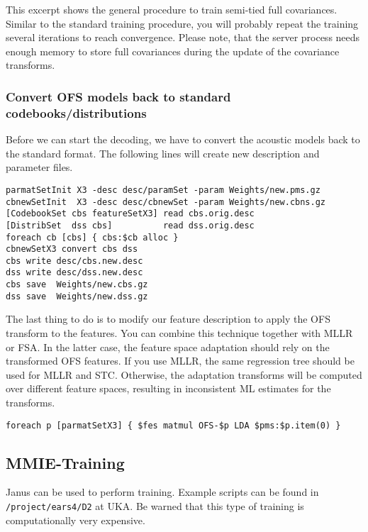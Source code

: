 This excerpt  shows   the general  procedure to train   semi-tied full
covariances.  Similar to the   standard training procedure,  you  will
probably repeat the  training several iterations to reach convergence.
Please note, that the server process needs enough memory to store full
covariances during the update of the covariance transforms.

\subsubsection{Convert OFS models back to standard codebooks/distributions}

Before we  can  start the  decoding, we  have to  convert the acoustic
models back to  the standard format.  The following  lines will create
new description and parameter files.

\begin{verbatim}
parmatSetInit X3 -desc desc/paramSet -param Weights/new.pms.gz
cbnewSetInit  X3 -desc desc/cbnewSet -param Weights/new.cbns.gz
[CodebookSet cbs featureSetX3] read cbs.orig.desc
[DistribSet  dss cbs]          read dss.orig.desc
foreach cb [cbs] { cbs:$cb alloc } 
cbnewSetX3 convert cbs dss
cbs write desc/cbs.new.desc
dss write desc/dss.new.desc
cbs save  Weights/new.cbs.gz
dss save  Weights/new.dss.gz
\end{verbatim}

The  last thing to  do is to modify our  feature description to apply
the OFS  transform  to the features.  You  can  combine this technique
together  with MLLR  or   FSA. In the  latter   case, the feature   space
adaptation  should rely  on the  transformed OFS  features. If you use
MLLR,  the  same  regression    tree should  be  used for    MLLR  and
STC.   Otherwise,  the adaptation   transforms will  be  computed over
different feature spaces, resulting  in inconsistent ML estimates  for
the transforms.

\begin{verbatim}
foreach p [parmatSetX3] { $fes matmul OFS-$p LDA $pms:$p.item(0) }
\end{verbatim}
\newpage


\subsection{MMIE-Training}


Janus can be used to  perform  training. Example  scripts
can be found in \texttt{/project/ears4/D2} at UKA. Be warned that this
type of training is computationally very expensive.

